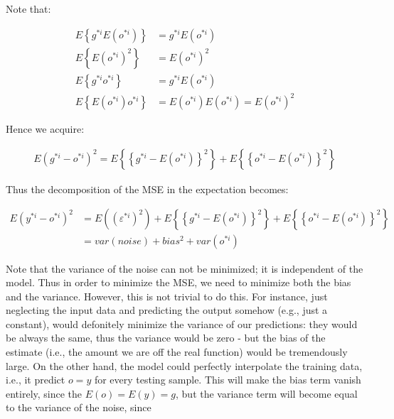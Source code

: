 \documentclass[runningheads,openany]{xhlPaper}
\begin{document}
Note that:

\begin{displaymath}
\begin{aligned}
E\left \{ g^{*i}E\left ( o^{*i} \right ) \right \}&=g^{*i}E\left ( o^{*i} \right )\\
E\left \{ E\left ( o^{*i} \right )^2 \right \}&=E\left ( o^{*i} \right )^2\\
E\left \{ g^{*i}o^{*i} \right \}&=g^{*i}E\left ( o^{*i} \right )\\
E\left \{ E\left ( o^{*i} \right )o^{*i} \right \}&=E\left ( o^{*i} \right )E\left ( o^{*i} \right )
=E\left ( o^{*i} \right )^2
\end{aligned}
\end{displaymath}

Hence we acquire:

\begin{displaymath}
\begin{aligned}
E\left ( g^{*i}-o^{*i} \right )^2 =E\left \{ \left \{ g^{*i} - E\left ( o^{*i} \right ) \right \}^2 \right \}+E\left \{ \left \{ o^{*i} - E\left ( o^{*i} \right ) \right \}^2 \right \}
\end{aligned}
\end{displaymath}

Thus the decomposition of the MSE in the expectation becomes:

\begin{displaymath}
\begin{aligned}
E\left ( y^{*i}-o^{*i} \right )^2&=E\left ( \left(\varepsilon^{*i}\right)^2  \right )+E\left \{ \left \{ g^{*i} - E\left ( o^{*i} \right ) \right \}^2 \right \}+E\left \{ \left \{ o^{*i} - E\left ( o^{*i} \right ) \right \}^2 \right \}\\
&=var\left(noise\right) + bias^2 + var\left(o^{*i}\right)
\end{aligned}
\end{displaymath}

Note that the variance of the noise can not be minimized; it is independent of the model.
Thus in order to minimize the MSE, we need to minimize both the bias and the variance.
However, this is not trivial to do this. For instance, just neglecting the input data and predicting the output somehow (e.g., just a constant), would defonitely minimize the variance of our predictions: they would be always the same, thus the variance would be zero - but the bias of the estimate (i.e., the amount we are off the real function) would be tremendously large. 
On the other hand, the model could perfectly interpolate the training data, i.e., it predict $o=y$ for every testing sample. 
This will make the bias term vanish entirely, since the $E\left(o\right)=E\left(y\right)=g$, but the variance term will become equal to the variance of the noise, since 
\end{document}
